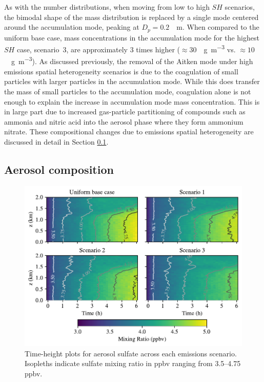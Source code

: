 As with the number distributions, when moving from low to high $SH$ scenarios, the bimodal shape of the mass distribution is replaced by a single mode centered around the accumulation mode, peaking at $D_p = 0.2$~\si{\mu m}. When compared to the uniform base case, mass concentrations in the accumulation mode for the highest $SH$ case, scenario~3, are approximately 3 times higher ($\approx30$~\si{\mu g.m^{-3}} vs. $\approx10$~\si{\mu g.m^{-3}}). As discussed previously, the removal of the Aitken mode under high emissions spatial heterogeneity scenarios is due to the coagulation of small particles with larger particles in the accumulation mode. While this does transfer the mass of small particles to the accumulation mode, coagulation alone is not enough to explain the increase in accumulation mode mass concentration. This is in large part due to increased gas-particle partitioning of compounds such as ammonia and nitric acid into the aerosol phase where they form ammonium nitrate. These compositional changes due to emissions spatial heterogeneity are discussed in detail in Section \ref{aero-comp}.


\subsection{Aerosol composition}\label{aero-comp}

\begin{figure}[!t]
  \centering
    \includegraphics[width=\textwidth]{figures/chapter5/height-time-pmc_SO4-four-scenarios.pdf}
    \caption{Time-height plots for aerosol sulfate across each emissions scenario. Isopleths indicate sulfate mixing ratio in ppbv ranging from 3.5--4.75 ppbv.}
    \label{fig:ht-so4}
\end{figure}

